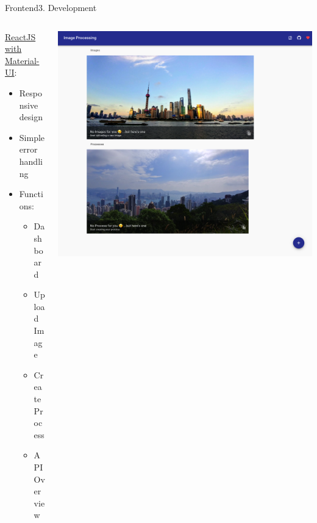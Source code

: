 \documentclass[aspectratio=169,20pt]{beamer}
\begin{document}
\begin{frame}{Frontend}{3. Development}
	\begin{columns}[onlytextwidth,T]
		\begin{column}{.40\linewidth}
			\underline{ReactJS with Material-UI}:
			\vspace{1in}
			\begin{itemize}
				\item{Responsive design}
				\item{Simple error handling}
				\item{Functions:}
				\begin{itemize}
					\item{Dashboard}
					\item{Upload Image}
					\item{Create Process}
					\item{API Overview}
				\end{itemize}
			\end{itemize}
		\end{column}	
		\begin{column}{.60\linewidth}
			\includegraphics[scale=0.30]{frontend}
		\end{column}
	\end{columns}
\end{frame}
\end{document}
